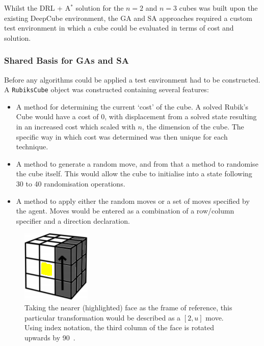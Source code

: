 \documentclass[UKenglish]{svproc}
\begin{document}
Whilst the DRL + A$^{\ast}$ solution for the $n=2$ and $n=3$ cubes was built upon the existing DeepCube environment, the GA and SA approaches required a custom test environment in which a cube could be evaluated in terms of cost and solution.

\subsubsection{Shared Basis for GAs and SA}
Before any algorithms could be applied a test environment had to be constructed. A \verb|RubiksCube| object was constructed containing several features:
\begin{itemize}
    \item A method for determining the current `cost' of the cube. A solved Rubik's Cube would have a cost of 0, with displacement from a solved state resulting in an increased cost which scaled with $n$, the dimension of the cube. The specific way in which cost was determined was then unique for each technique.
    \item A method to generate a random move, and from that a method to randomise the cube itself. This would allow the cube to initialise into a state following 30 to 40 randomisation operations.
    \item A method to apply either the random moves or a set of moves specified by the agent. Moves would be entered as a combination of a row/column specifier and a direction declaration.
\end{itemize}

\begin{figure}[!ht]
  \centering
  \begin{minipage}[c]{0.2\linewidth}
    \raggedleft
    \includegraphics[width=0.7\linewidth]{move-3u}
  \end{minipage}
  \hfill
  \begin{minipage}[c]{0.75\linewidth}
    \caption{Taking the nearer (highlighted) face as the frame of reference,
      this particular transformation would be described as a $[2,u]$ move. Using
      index notation, the third column of the face is rotated upwards by
      90\textdegree~\autocite{proj_l.hoang}.}
    \label{fig:move-3u}
  \end{minipage}
\end{figure}
\end{document}
